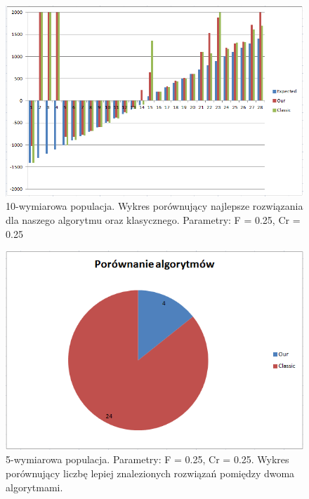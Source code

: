 \documentclass[a4paper]{article}
\begin{document}
\begin{figure}[!h]
\centering
\includegraphics[width=\textwidth]{F25Cr25L10chart.png}
\caption{10-wymiarowa populacja. Wykres porównujący najlepsze rozwiązania dla naszego algorytmu oraz klasycznego. Parametry: F = 0.25, Cr = 0.25}
\end{figure}

\begin{figure}[!h]
\centering
\includegraphics[width=\textwidth]{F25Cr25L10statystyka.png}
\caption{5-wymiarowa populacja. Parametry: F = 0.25, Cr = 0.25. Wykres porównujący liczbę lepiej znalezionych rozwiązań pomiędzy dwoma algorytmami.}
\end{figure}
\end{document}

